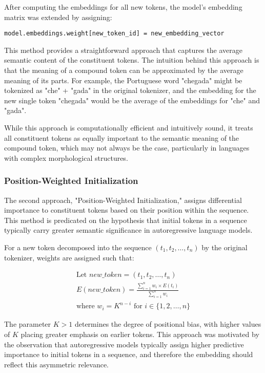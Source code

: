 After computing the embeddings for all new tokens, the model's embedding matrix was extended by assigning:

\begin{verbatim}
model.embeddings.weight[new_token_id] = new_embedding_vector
\end{verbatim}

This method provides a straightforward approach that captures the average semantic content of the constituent tokens. The intuition behind this approach is that the meaning of a compound token can be approximated by the average meaning of its parts. For example, the Portuguese word "chegada" might be tokenized as "che" + "gada" in the original tokenizer, and the embedding for the new single token "chegada" would be the average of the embeddings for "che" and "gada".

While this approach is computationally efficient and intuitively sound, it treats all constituent tokens as equally important to the semantic meaning of the compound token, which may not always be the case, particularly in languages with complex morphological structures.

\subsubsection{Position-Weighted Initialization}
The second approach, "Position-Weighted Initialization," assigns differential importance to constituent tokens based on their position within the sequence. This method is predicated on the hypothesis that initial tokens in a sequence typically carry greater semantic significance in autoregressive language models.

For a new token decomposed into the sequence $(t_1, t_2, \ldots, t_n)$ by the original tokenizer, weights are assigned such that:

$$
\begin{array}{c}
    \text{Let } new\_token = (t_1, t_2, \ldots, t_n) \\
    E(new\_token) = \frac{\sum_{i=1}^{n} w_i \times E(t_i)}{\sum_{i=1}^{n} w_i} \\
    \text{where } w_i = K^{n-i} \text{ for } i \in \{1,2,\ldots,n\}
\end{array}
$$

The parameter $K > 1$ determines the degree of positional bias, with higher values of $K$ placing greater emphasis on earlier tokens. This approach was motivated by the observation that autoregressive models typically assign higher predictive importance to initial tokens in a sequence, and therefore the embedding should reflect this asymmetric relevance.

